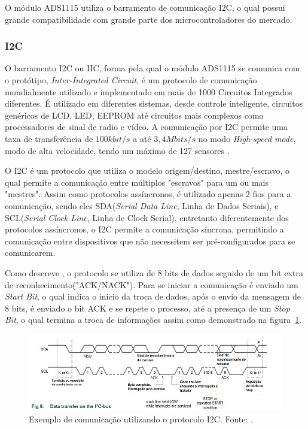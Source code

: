 O módulo ADS1115 utiliza o barramento de comunicação I2C, o qual possui grande compatibilidade com grande parte dos microcontroladores do mercado.

\subsubsection{I2C}

O barramento I2C ou IIC, forma pela qual o módulo ADS1115 se comunica com o protótipo, \textit{Inter-Integrated Circuit}, é um protocolo de comunicação mundialmente utilizado e implementado em mais de 1000 Circuitos Integrados diferentes. É utilizado em diferentes sistemas, desde controle inteligente, circuitos genéricos de LCD, LED, EEPROM até circuitos mais complexos como processadores de sinal de radio e vídeo. A comunicação por I2C permite uma taxa de transferência de $100 kbit/s$ a até $3,4 Mbits/s$ no modo \textit{High-speed mode}, modo de alta velocidade, tendo um máximo de 127 sensores \cite{semiconductors2000i2c}.

O I2C é um protocolo que utiliza o modelo origem/destino, mestre/escravo, o qual permite a comunicação entre múltiplos "escravos" para um ou mais "mestres". Assim como protocolos assíncronos, é utilizado apenas 2 fios para a comunicação, sendo eles SDA(\textit{Serial Data Line}, Linha de Dados Seriais), e SCL(\textit{Serial Clock Line}, Linha de Clock Serial), entretanto diferentemente dos protocolos assíncronos, o I2C permite a comunicação síncrona, permitindo a comunicação entre dispositivos que não necessitem ser pré-configurados para se comunicarem.

Como descreve , o protocolo se utiliza de 8 bits de dados seguido de um bit extra de reconhecimento("ACK/NACK"). Para se iniciar a comunicação é enviado um \textit{Start Bit}, o qual indica o inicio da troca de dados, após o envio da mensagem de 8 bits, é enviado o bit ACK e se repete o processo, até a presença de um \textit{Stop Bit}, o qual termina a troca de informações assim como demonstrado na figura~\ref{fig:I2C1}.

\FloatBarrier
\begin{figure}[!htbp]
	\centering
	\includegraphics[scale=0.7]{imagens/I2C}
	\caption{Exemplo de comunicação utilizando o protocolo I2C. Fonte: \cite{semiconductors2000i2c}. }
	
	\label{fig:I2C1}
\end{figure}
\FloatBarrier

